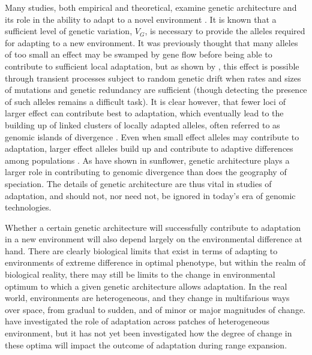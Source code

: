 Many studies, both empirical and theoretical, examine genetic architecture and its role in the ability to adapt to a novel environment \citep{Yeaman:2015, Yeaman:2011, Carroll:2001, Holloway:1990, Peichel:2001, Bratteler:2006, Schiffers:2014}. It is known that a sufficient level of genetic variation, $V_G$, is necessary to provide the alleles required for adapting to a new environment. It was previously thought that many alleles of too small an effect may be swamped by gene flow before being able to contribute to sufficient local adaptation, but as shown by \citep{Yeaman:2015}, this effect is possible through transient processes subject to random genetic drift when rates and sizes of mutations and genetic redundancy are sufficient (though detecting the presence of such alleles remains a difficult task). It is clear however, that fewer loci of larger effect can contribute best to adaptation, which eventually lead to the building up of linked clusters of locally adapted alleles, often referred to as genomic islands of divergence \citep{Feder:2010}. Even when small effect alleles may contribute to adaptation, larger effect alleles build up and contribute to adaptive differences among populations \citep{Yeaman:2011}. As \citet{Renaut:2013} have shown in sunflower, genetic architecture plays a larger role in contributing to genomic divergence than does the geography of speciation. %
The details of genetic architecture are thus vital in studies of adaptation, and should not, nor need not, be ignored in today's era of genomic technologies. %

Whether a certain genetic architecture will successfully contribute to adaptation in a new environment will also depend largely on the environmental difference at hand. There are clearly biological limits that exist in terms of adapting to environments of extreme difference in optimal phenotype, but within the realm of biological reality, there may still be limits to the change in environmental optimum to which a given genetic architecture allows adaptation. In the real world, environments are heterogeneous, and they change in multifarious ways over space, from gradual to sudden, and of minor or major magnitudes of change. \citet{Schiffers:2014} have investigated the role of adaptation across patches of heterogeneous environment, but it has not yet been investigated how the degree of change in these optima will impact the outcome of adaptation during range expansion.


